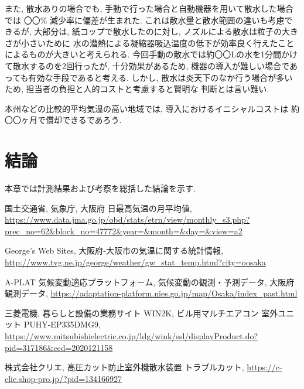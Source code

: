 \documentclass[a4j,fleqn,dvipdfmx,uplatex]{jsarticle}
\begin{document}
また, 散水ありの場合でも, 手動で行った場合と自動機器を用いて散水した場合では
〇〇\% 減少率に偏差が生まれた. これは散水量と散水範囲の違いも考慮できるが, 
大部分は, 紙コップで散水したのに対し, ノズルによる散水は粒子の大きさが小さいために
水の潜熱による凝縮器吸込温度の低下が効率良く行えたことによるものが大きいと考えられる. 
今回手動の散水では約〇〇Lの水を1分間かけて散水するのを2回行ったが, 十分効果があるため, 
機器の導入が難しい場合であっても有効な手段であると考える. 
しかし, 散水は炎天下のなか行う場合が多いため, 担当者の負担と人的コストと考慮すると賢明な
判断とは言い難い. 

本州などの比較的平均気温の高い地域では, 導入におけるイニシャルコストは
約〇〇ヶ月で償却できるであろう. 

\section{結論}
本章では計測結果および考察を総括した結論を示す. 

\begin{thebibliography}{99}
国土交通省, 気象庁, 大阪府 日最高気温の月平均値, 
\url{https://www.data.jma.go.jp/obd/stats/etrn/view/monthly_s3.php?prec_no=62&block_no=47772&year=&month=&day=&view=a2}\vspace{2mm}

George's Web Sites, 大阪府-大阪市の気温に関する統計情報, 
\url{http://www.tvg.ne.jp/george/weather/gw_stat_temp.html?city=oosaka}\vspace{2mm}

A-PLAT 気候変動適応プラットフォーム, 気候変動の観測・予測データ, 大阪府観測データ, 
\url{https://adaptation-platform.nies.go.jp/map/Osaka/index_past.html}\vspace{2mm}

三菱電機, 暮らしと設備の業務サイト WIN2K, ビル用マルチエアコン 室外ユニット PUHY-EP335DMG9, 
\url{https://www.mitsubishielectric.co.jp/ldg/wink/ssl/displayProduct.do?pid=317186&ccd=2020121158}\vspace{2mm}

株式会社クリエ, 高圧カット防止室外機散水装置 トラブルカット, 
\url{https://c-clie.shop-pro.jp/?pid=134166927}\vspace{2mm}

\end{thebibliography}
%
%
%
\end{document}
